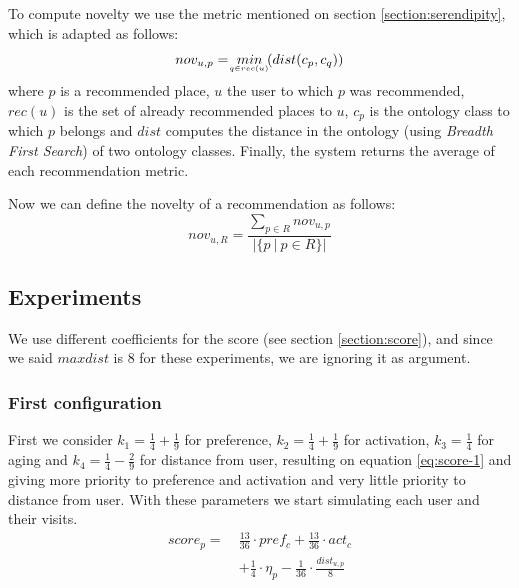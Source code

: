 To compute novelty \cite{kotkov2016survey} we use the metric mentioned on section \ref{section:serendipity}, which is adapted as follows:
\begin{equation} \label{eq:novelty}
    nov_{u, p} = \  \underaccent{q \in rec(u)}{min} \  ( dist( c_p, c_q ) )
\end{equation}
where $p$ is a recommended place, $u$ the user to which $p$ was recommended, $rec(u)$ is the set of already recommended places to $u$, $c_p$ is the ontology class to which $p$ belongs and $dist$ computes the distance in the ontology (using \textit{Breadth First Search}) of two ontology classes. Finally, the system returns the average of each recommendation metric.

Now we can define the novelty of a recommendation as follows:
\begin{equation}
    nov_{u, R} = \frac{ \displaystyle \sum_{p \in R}{nov_{u, p}} }{|\lbrace p \ | \ p \in R \rbrace|}
\end{equation}

\subsection{Experiments}
We use different coefficients for the score (see section \ref{section:score}), and since we said $maxdist$ is $8$ for these experiments, we are ignoring it as argument. 

\subsubsection{First configuration}
First we consider $k_1 = \frac{1}{4} + \frac{1}{9}$ for preference, $k_2 = \frac{1}{4} + \frac{1}{9}$ for activation, $k_3 = \frac{1}{4}$ for aging and $k_4 = \frac{1}{4} - \frac{2}{9}$ for distance from user, resulting on equation \ref{eq:score-1} and giving more priority to preference and activation and very little priority to distance from user. With these parameters we start simulating each user and their visits.
\begin{equation} \label{eq:score-1}
    \begin{split}
        score_p = \ &\frac{13}{36} \cdot pref_c + \frac{13}{36} \cdot act_c \\
                                        &+ \frac{1}{4} \cdot \eta_p - \frac{1}{36} \cdot \frac{dist_{u,p}}{8}
    \end{split}
\end{equation}

